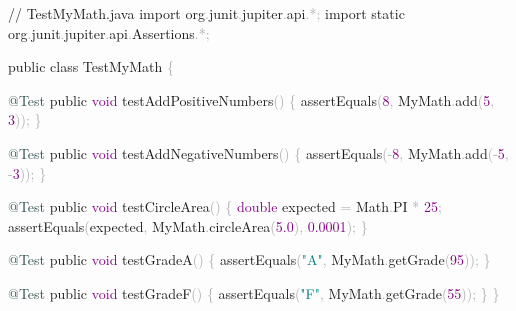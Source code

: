 \documentclass[
  justified,
  openright,
]{tufte-book}
\newcommand{\AttributeTok}[1]{\textcolor{DarkSlateGray}{#1}}
\newcommand{\BuiltInTok}[1]{#1}
\newcommand{\CommentTok}[1]{\textcolor{MidGray}{#1}}
\newcommand{\DataTypeTok}[1]{\textcolor{Purple}{#1}}
\newcommand{\DecValTok}[1]{\textcolor{Purple}{#1}}
\newcommand{\FloatTok}[1]{\textcolor{Purple}{#1}}
\newcommand{\FunctionTok}[1]{\textcolor{BrandBlue}{#1}}
\newcommand{\ImportTok}[1]{\textcolor{BrandAccent}{#1}}
\newcommand{\KeywordTok}[1]{\textcolor{BrandBlue}{#1}}
\newcommand{\NormalTok}[1]{#1}
\newcommand{\OperatorTok}[1]{\textcolor{DarkGray}{#1}}
\newcommand{\StringTok}[1]{\textcolor{Teal}{#1}}
\newenvironment{Shaded}{%
  \begin{snugshade}
}{%
  \end{snugshade}
}
\begin{document}
\begin{Shaded}
\begin{Highlighting}[]
\CommentTok{// TestMyMath.java}
\KeywordTok{import} \ImportTok{org}\OperatorTok{.}\ImportTok{junit}\OperatorTok{.}\ImportTok{jupiter}\OperatorTok{.}\ImportTok{api}\OperatorTok{.*;}
\KeywordTok{import} \KeywordTok{static}\ImportTok{ org}\OperatorTok{.}\ImportTok{junit}\OperatorTok{.}\ImportTok{jupiter}\OperatorTok{.}\ImportTok{api}\OperatorTok{.}\ImportTok{Assertions}\OperatorTok{.*;}

\KeywordTok{public} \KeywordTok{class}\NormalTok{ TestMyMath }\OperatorTok{\{}

    \AttributeTok{@Test}
    \KeywordTok{public} \DataTypeTok{void} \FunctionTok{testAddPositiveNumbers}\OperatorTok{()} \OperatorTok{\{}
        \FunctionTok{assertEquals}\OperatorTok{(}\DecValTok{8}\OperatorTok{,}\NormalTok{ MyMath}\OperatorTok{.}\FunctionTok{add}\OperatorTok{(}\DecValTok{5}\OperatorTok{,} \DecValTok{3}\OperatorTok{));}
    \OperatorTok{\}}

    \AttributeTok{@Test}
    \KeywordTok{public} \DataTypeTok{void} \FunctionTok{testAddNegativeNumbers}\OperatorTok{()} \OperatorTok{\{}
        \FunctionTok{assertEquals}\OperatorTok{({-}}\DecValTok{8}\OperatorTok{,}\NormalTok{ MyMath}\OperatorTok{.}\FunctionTok{add}\OperatorTok{({-}}\DecValTok{5}\OperatorTok{,} \OperatorTok{{-}}\DecValTok{3}\OperatorTok{));}
    \OperatorTok{\}}

    \AttributeTok{@Test}
    \KeywordTok{public} \DataTypeTok{void} \FunctionTok{testCircleArea}\OperatorTok{()} \OperatorTok{\{}
        \DataTypeTok{double}\NormalTok{ expected }\OperatorTok{=} \BuiltInTok{Math}\OperatorTok{.}\FunctionTok{PI} \OperatorTok{*} \DecValTok{25}\OperatorTok{;}
        \FunctionTok{assertEquals}\OperatorTok{(}\NormalTok{expected}\OperatorTok{,}\NormalTok{ MyMath}\OperatorTok{.}\FunctionTok{circleArea}\OperatorTok{(}\FloatTok{5.0}\OperatorTok{),} \FloatTok{0.0001}\OperatorTok{);}
    \OperatorTok{\}}

    \AttributeTok{@Test}
    \KeywordTok{public} \DataTypeTok{void} \FunctionTok{testGradeA}\OperatorTok{()} \OperatorTok{\{}
        \FunctionTok{assertEquals}\OperatorTok{(}\StringTok{"A"}\OperatorTok{,}\NormalTok{ MyMath}\OperatorTok{.}\FunctionTok{getGrade}\OperatorTok{(}\DecValTok{95}\OperatorTok{));}
    \OperatorTok{\}}

    \AttributeTok{@Test}
    \KeywordTok{public} \DataTypeTok{void} \FunctionTok{testGradeF}\OperatorTok{()} \OperatorTok{\{}
        \FunctionTok{assertEquals}\OperatorTok{(}\StringTok{"F"}\OperatorTok{,}\NormalTok{ MyMath}\OperatorTok{.}\FunctionTok{getGrade}\OperatorTok{(}\DecValTok{55}\OperatorTok{));}
    \OperatorTok{\}}
\OperatorTok{\}}
\end{Highlighting}
\end{Shaded}
\end{document}
